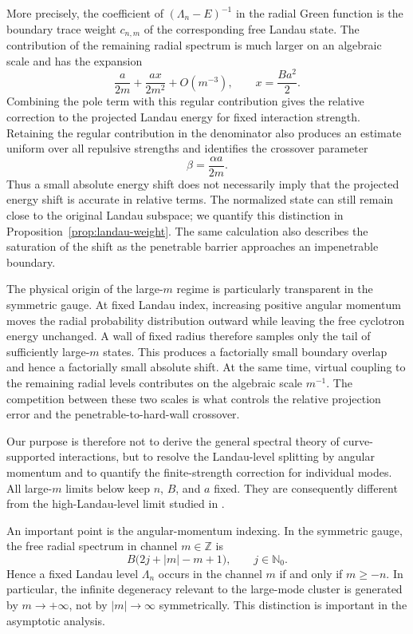 \documentclass[12pt,a4paper]{article}
\numberwithin{equation}{section}
\theoremstyle{remark}
\theoremstyle{definition}
\newcommand{\N}{\mathbb N}
\begin{document}
More precisely, the coefficient of $(\Lambda_n-E)^{-1}$ in the radial
Green function is the boundary trace weight $c_{n,m}$ of the corresponding free
Landau state.  The contribution of the remaining radial spectrum is much
larger on an algebraic scale and has the expansion
$$
\frac{a}{2m}+\frac{ax}{2m^2}+O(m^{-3}),
\qquad
x=\frac{Ba^2}{2}.
$$
Combining the pole term with this regular contribution gives the relative
correction to the projected Landau energy for fixed interaction strength.
Retaining the regular contribution in the denominator also produces an
estimate uniform over all repulsive strengths and identifies the crossover
parameter
$$
\beta=\frac{\alpha a}{2m}.
$$
Thus a small absolute energy shift does not necessarily imply that
the projected energy shift is accurate in relative terms. The normalized
state can still remain close to the original Landau subspace; we quantify
this distinction in Proposition~\ref{prop:landau-weight}. The same
calculation also describes the saturation of the shift as the penetrable
barrier approaches an impenetrable boundary.

The physical origin of the large-$m$ regime is particularly transparent in
the symmetric gauge.  At fixed Landau index, increasing positive angular
momentum moves the radial probability distribution outward while leaving
the free cyclotron energy unchanged.  A wall of fixed radius therefore
samples only the tail of sufficiently large-$m$ states.  This produces a
factorially small boundary overlap and hence a factorially small absolute
shift.  At the same time, virtual coupling to the remaining radial levels
contributes on the algebraic scale $m^{-1}$.  The competition between these
two scales is what controls the relative projection error and the
penetrable-to-hard-wall crossover.

Our purpose is therefore not to derive the general spectral theory of
curve-supported interactions, but to resolve the Landau-level splitting by
angular momentum and to quantify the finite-strength correction for
individual modes.  All large-$m$ limits below keep $n$, $B$, and $a$ fixed.
They are consequently different from the high-Landau-level limit studied
in \cite{PushnitskiRaikovVillegas2013}.

An important point is the angular-momentum indexing.  In the symmetric
gauge, the free radial spectrum in channel $m\in\mathbb Z$ is
$$
B\bigl(2j+|m|-m+1\bigr),\qquad j\in\N_0.
$$
Hence a fixed Landau level $\Lambda_n$ occurs in the channel $m$ if and
only if $m\ge -n$.  In particular, the infinite degeneracy relevant to the
large-mode cluster is generated by $m\to+\infty$, not by
$|m|\to\infty$ symmetrically.  This distinction is important in the
asymptotic analysis.
\end{document}
